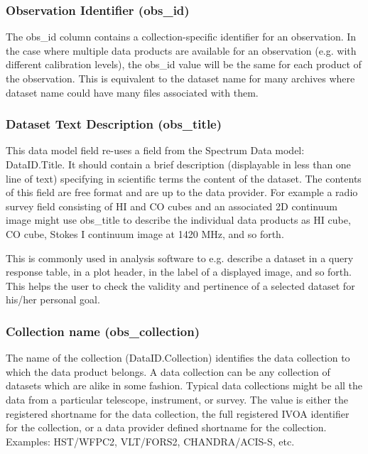 \documentclass[11pt,a4paper]{ivoa}
\begin{document}
\subsubsection{Observation Identifier (obs\_id)}
The obs\_id column contains a collection-specific identifier for an observation. In the case where multiple data
products are available for an observation (e.g. with different calibration levels), the obs\_id value will be the same
for each product of the observation. This is equivalent to the dataset name for many archives where dataset name could
have many files associated with them. 

\subsubsection{Dataset Text Description (obs\_title)}
\label{bkm:Ref292046860}This data model field re-uses a field from the Spectrum Data model: DataID.Title. It should
contain a brief description (displayable in less than one line of text) specifying in scientific terms the content of
the dataset.  The contents of this field are free format and are up to the data provider.  For example a radio survey
field consisting of HI and CO cubes and an associated 2D continuum image might use obs\_title to describe the
individual data products as {\textquotedbl}HI cube{\textquotedbl}, {\textquotedbl}CO cube{\textquotedbl},
{\textquotedbl}Stokes I continuum image at 1420 MHz{\textquotedbl}, and so forth.

This is commonly used in analysis software to e.g. describe a dataset in a query response table, in a plot header, in
the label of a displayed image, and so forth. This helps the user to check the validity and pertinence of a selected
dataset for his/her personal goal. 

\subsubsection{Collection name (obs\_collection)}
The name of the collection (DataID.Collection) identifies the data collection to which the data product belongs.  A data
collection can be any collection of datasets which are alike in some fashion.  Typical data collections might be all
the data from a particular telescope, instrument, or survey. The value is either the registered shortname for the data
collection, the full registered IVOA identifier for the collection, or a data provider defined shortname for the
collection. Examples: HST/WFPC2, VLT/FORS2, CHANDRA/ACIS-S, etc.
\end{document}
